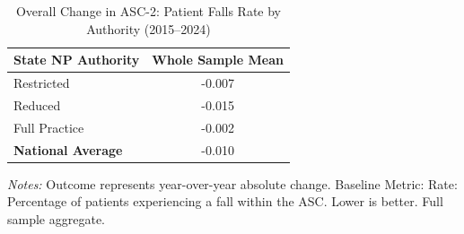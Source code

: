 \begin{table}[htbp]
    \centering
    \caption{Overall Change in ASC-2: Patient Falls Rate by Authority (2015--2024)}
    \label{tab:d_asc_rate_2_full}
    \vspace{0.2cm}
    \begin{tabular}{lc}
        \toprule
        \textbf{State NP Authority} & \textbf{Whole Sample Mean} \\
        \midrule
        Restricted & -0.007 \\
        Reduced & -0.015 \\
        Full Practice & -0.002 \\
        \midrule
        \textbf{National Average} & -0.010 \\
        \bottomrule
    \end{tabular}
    \vspace{0.1cm}
    \begin{minipage}{0.6\textwidth}
        \footnotesize \textit{Notes:} Outcome represents year-over-year absolute change. Baseline Metric: Rate: Percentage of patients experiencing a fall within the ASC. Lower is better. Full sample aggregate.
    \end{minipage}
\end{table}